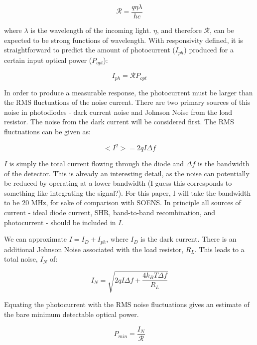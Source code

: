 \documentclass[12pt]{article}
\begin{document}
\begin{equation}
    \mathcal{R} = \frac{q\eta\lambda}{hc}
\end{equation}

where $\lambda$ is the wavelength of the incoming light. $\eta$, and therefore $\mathcal{R}$, can be expected to be strong functions of wavelength. With responsivity defined, it is straightforward to predict the amount of photocurrent ($I_{ph}$) produced for a certain input optical power ($P_{opt}$):

\begin{equation}
    I_{ph} = \mathcal{R}P_{opt}
\end{equation}

In order to produce a measurable response, the photocurrent must be larger than the RMS fluctuations of the noise current. There are two primary sources of this noise in photodiodes - dark current noise and Johnson Noise from the load resistor. The noise from the dark current will be considered first. The RMS fluctuations can be given as:

\begin{equation}
    <I^{2}> = 2qI\Delta f
\end{equation}

$I$ is simply the total current flowing through the diode and $\Delta f$ is the bandwidth of the detector. This is already an interesting detail, as the noise can potentially be reduced by operating at a lower bandwidth (I guess this corresponds to something like integrating the signal?). For this paper, I will take the bandwidth to be 20 MHz, for sake of comparison with SOENS. In principle all sources of current - ideal diode current, SHR, band-to-band recombination, and photocurrent - should be included in $I$. 

We can approximate $I = I_{D} + I_{ph}$, where $I_{D}$ is the dark current. There is an additional Johnson Noise associated with the load resistor, $R_{L}$. This leads to a total noise, $I_{N}$ of:

\begin{equation}
    I_{N} = \sqrt{2qI\Delta f + \frac{4k_{B}T\Delta f}{R_{L}}}
\end{equation}

Equating the photocurrent with the RMS noise fluctuations gives an estimate of the bare minimum detectable optical power.

\begin{equation}
    P_{min} = \frac{I_N}{\mathcal{R}}
\end{equation}
\end{document}

